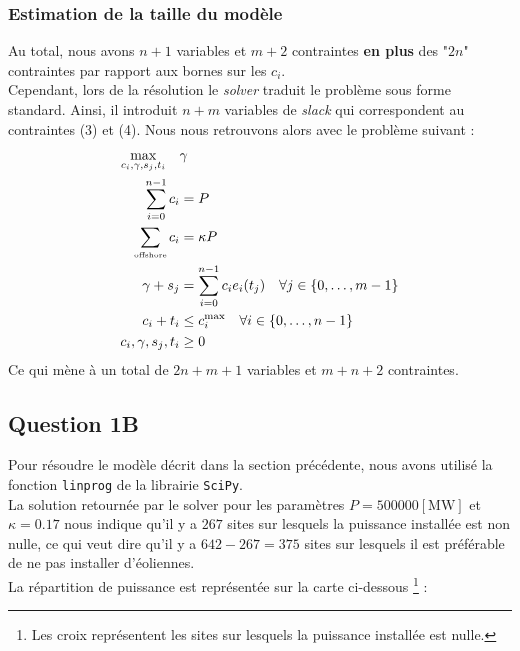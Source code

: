 \documentclass{article}
\begin{document}
\subsubsection*{Estimation de la taille du modèle}
\noindent
Au total, nous avons $n + 1$
variables et $m + 2$ contraintes \textbf{en plus} des "$2n$" contraintes par rapport aux bornes sur les $c_i$.\\
Cependant, lors de la résolution le \textit{solver} traduit le problème sous forme standard. Ainsi, il introduit $n + m$ variables de \textit{slack} qui correspondent au contraintes (3) et (4). Nous nous retrouvons alors avec le problème suivant : 
\begin{align*}
    \max_{c_i, \gamma, s_j, t_i} \quad  
    &\gamma \nonumber \\ 
    \sum_{i=0}^{n-1} c_i &= P\\
    \sum_{\text{\tiny offshore}}c_i &= \kappa P\\
    \gamma + s_j &= \sum_{i=0}^{n-1} c_i e_i(t_j) \quad \forall j \in \{0, \ldots, m-1\}\\
    c_i + t_i &\le c_i^{\max} \quad \forall i \in \{0, \ldots, n-1\}\\
    c_i, \gamma, s_j, t_i &\ge 0
\end{align*}
Ce qui mène à un total de $2n + m + 1$ variables et $m + n + 2$ contraintes.
\newpage
\subsection*{Question 1B}
Pour résoudre le modèle décrit dans la section précédente, nous avons utilisé la fonction \verb|linprog| de la librairie \verb|SciPy|.\\
La solution retournée par le solver pour les paramètres $P = 500000 [\mathrm{MW}]$ et $\kappa = 0.17$ nous indique qu'il y a $267$ sites sur lesquels la puissance installée est non nulle, ce qui veut dire qu'il y a $642 - 267 = 375$ sites sur lesquels il est préférable de ne pas installer d'éoliennes.\\
La répartition de puissance est représentée sur la carte ci-dessous \footnote{Les croix représentent les sites sur lesquels la puissance installée est nulle.} :
\end{document}
